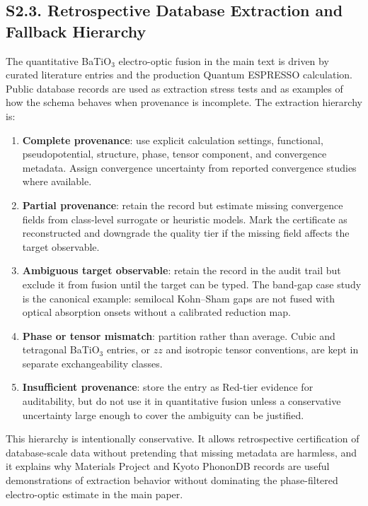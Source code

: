 ﻿\documentclass[prb,onecolumn,superscriptaddress,amsmath,amssymb,longbibliography]{revtex4-2}
\begin{document}
\subsection{S2.3. Retrospective Database Extraction and Fallback Hierarchy}

The quantitative BaTiO$_3$ electro-optic fusion in the main text is driven by
curated literature entries and the production Quantum ESPRESSO calculation.
Public database records are used as extraction stress tests and as examples of
how the schema behaves when provenance is incomplete. The extraction hierarchy
is:

\begin{enumerate}
    \item \textbf{Complete provenance}: use explicit calculation settings,
    functional, pseudopotential, structure, phase, tensor component, and
    convergence metadata. Assign convergence uncertainty from reported
    convergence studies where available.
    \item \textbf{Partial provenance}: retain the record but estimate missing
    convergence fields from class-level surrogate or heuristic models. Mark the
    certificate as reconstructed and downgrade the quality tier if the missing
    field affects the target observable.
    \item \textbf{Ambiguous target observable}: retain the record in the audit
    trail but exclude it from fusion until the target can be typed. The band-gap
    case study is the canonical example: semilocal Kohn--Sham gaps are not
    fused with optical absorption onsets without a calibrated reduction map.
    \item \textbf{Phase or tensor mismatch}: partition rather than average.
    Cubic and tetragonal BaTiO$_3$ entries, or $zz$ and isotropic tensor
    conventions, are kept in separate exchangeability classes.
    \item \textbf{Insufficient provenance}: store the entry as Red-tier
    evidence for auditability, but do not use it in quantitative fusion unless
    a conservative uncertainty large enough to cover the ambiguity can be
    justified.
\end{enumerate}

This hierarchy is intentionally conservative. It allows retrospective
certification of database-scale data without pretending that missing metadata
are harmless, and it explains why Materials Project and Kyoto PhononDB records
are useful demonstrations of extraction behavior without dominating the
phase-filtered electro-optic estimate in the main paper.
\end{document}
